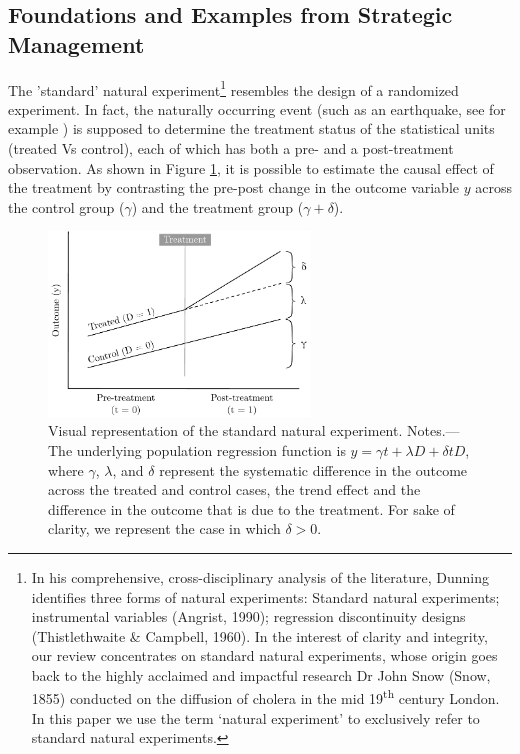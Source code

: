 \documentclass[nobib]{tufte-handout}
\begin{document}
\begin{refsection}
\subsection{Foundations and Examples from Strategic Management}
\label{sub:foundations_examples}

\noindent The 'standard' natural experiment\footnote{In his comprehensive,
    cross-disciplinary analysis of the literature, Dunning
    \citeyear[][]{Dunning2012} identifies
    three forms of natural experiments: Standard natural experiments;
    instrumental variables (Angrist, 1990); regression discontinuity designs
    (Thistlethwaite \& Campbell, 1960). In the interest of clarity and
    integrity, our review concentrates on standard natural experiments, whose
    origin goes back to the highly acclaimed and impactful research Dr John Snow
    (Snow, 1855) conducted on the diffusion of cholera in the mid
19\textsuperscript{th} century London. In this paper we use the term `natural
experiment' to exclusively refer to standard natural experiments.} resembles the
design of a randomized experiment. In fact, the naturally occurring event (such
as an earthquake, see for example \cite[][]{Belloc2016}) is supposed
to determine the treatment status of the statistical units (treated Vs control),
each of which has both a pre- and a post-treatment observation. As shown in
Figure \ref{fig:ne_logic_viz}, it is possible to estimate the causal effect of the treatment by
contrasting the pre-post change in the outcome variable $y$ across
the control group ($\gamma$) and the treatment group 
($ \gamma + \delta$).

\begin{figure}[]
    \centering
    \includegraphics[width=0.62\textwidth]{images/ne_logic_viz.pdf}
    \caption{Visual representation of the standard natural experiment. Notes.---
        The underlying population regression function is $y = \gamma t +
        \lambda D + \delta t D$, where $\gamma$, $\lambda$, and $\delta$ represent 
        the systematic difference in the outcome across the treated and control 
        cases, the trend effect and the difference in the outcome that is due to
        the treatment. For sake of clarity, we represent the case in which
        $\delta > 0$.}
    \label{fig:ne_logic_viz}
\end{figure}


\end{refsection}
\end{document}
